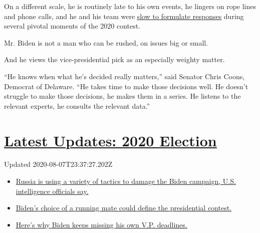 On a different scale, he is routinely late to his own events, he lingers
on rope lines and phone calls, and he and his team were
\href{https://www.nytimes3xbfgragh.onion/2019/10/05/us/politics/biden-trump-ukraine.html}{slow
to formulate responses} during several pivotal moments of the 2020
contest.

Mr. Biden is not a man who can be rushed, on issues big or small.

And he views the vice-presidential pick as an especially weighty matter.

``He knows when what he's decided really matters,'' said Senator Chris
Coons, Democrat of Delaware. ``He takes time to make those decisions
well. He doesn't struggle to make those decisions, he makes them in a
series. He listens to the relevant experts, he consults the relevant
data.''

\hypertarget{latest-updates-2020-election}{%
\section{\texorpdfstring{\href{https://www.nytimes3xbfgragh.onion/2020/08/07/us/elections/trump-biden.html?action=click\&pgtype=Article\&state=default\&region=MAIN_CONTENT_1\&context=storylines_live_updates}{Latest
Updates: 2020
Election}}{Latest Updates: 2020 Election}}\label{latest-updates-2020-election}}

Updated 2020-08-07T23:37:27.202Z

\begin{itemize}
\tightlist
\item
  \href{https://www.nytimes3xbfgragh.onion/2020/08/07/us/elections/trump-biden.html?action=click\&pgtype=Article\&state=default\&region=MAIN_CONTENT_1\&context=storylines_live_updates\#link-77a72de1}{Russia
  is using a variety of tactics to damage the Biden campaign, U.S.
  intelligence officials say.}
\item
  \href{https://www.nytimes3xbfgragh.onion/2020/08/07/us/elections/trump-biden.html?action=click\&pgtype=Article\&state=default\&region=MAIN_CONTENT_1\&context=storylines_live_updates\#link-1ab01601}{Biden's
  choice of a running mate could define the presidential contest.}
\item
  \href{https://www.nytimes3xbfgragh.onion/2020/08/07/us/elections/trump-biden.html?action=click\&pgtype=Article\&state=default\&region=MAIN_CONTENT_1\&context=storylines_live_updates\#link-4b53533c}{Here's
  why Biden keeps missing his own V.P. deadlines.}
\end{itemize}

